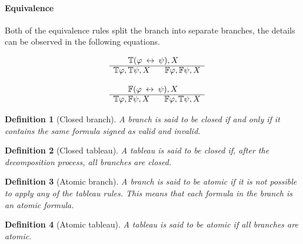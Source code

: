 \documentclass{article}
\newtheorem{defn}{Definition}[section]
\newcommand{\signT}{\mathbb{T}}
\newcommand{\signF}{\mathbb{F}}
\begin{document}
		\paragraph{Equivalence}
Both of the equivalence rules split the branch into separate branches, the details can be observed in the following equations.
		\newline
		\noindent\begin{minipage}{.5\linewidth}
		\begin{align*}
			\begin{array}{rl}
				& \:\:\:\:\:\:\:\: \signT(\varphi \: \leftrightarrow \: \psi), X \\
			      \cline{2-2}
			      & \signT\varphi, \signT\psi, X \:\:\:\:\:\:\:\: \signF\varphi, \signF\psi, X
			\end{array}
		\end{align*}
		\end{minipage}%
		\begin{minipage}{.5\linewidth}
		\begin{align*}
			\begin{array}{rl}
				& \:\:\:\:\:\:\:\: \signF(\varphi \: \leftrightarrow \: \psi), X \\
			      \cline{2-2}
			      & \signT\varphi, \signF\psi, X \:\:\:\:\:\:\:\: \signF\varphi, \signT\psi, X
			\end{array}
		\end{align*}
		\end{minipage}
		\newline
		\begin{defn}[Closed branch]
A branch is said to be closed if and only if it contains the same formula signed as valid and invalid.
		\end{defn}

		\begin{defn}[Closed tableau]
		\label{closed-tableau} 
A tableau is said to be closed if, after the decomposition process, all branches are closed.
		\end{defn}

		\begin{defn}[Atomic branch]
A branch is said to be atomic if it is not possible to apply any of the tableau rules. This means that each formula in the branch is an atomic formula.
		\end{defn}

		\begin{defn}[Atomic tableau]
A tableau is said to be atomic if all branches are atomic.
		\end{defn}
\end{document}
